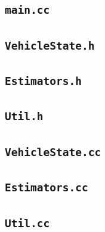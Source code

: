\documentclass[11pt]{article}
\begin{document}
\subsection{\texttt{main.cc}}



\subsection{\texttt{VehicleState.h}}


\subsection{\texttt{Estimators.h}}


\subsection{\texttt{Util.h}}


\subsection{\texttt{VehicleState.cc}}


\subsection{\texttt{Estimators.cc}}


\subsection{\texttt{Util.cc}}

\end{document}
